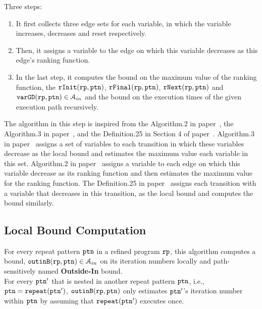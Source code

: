 \textbf{}

Three steps:
\begin{enumerate}
    \item It first collects three edge sets for each variable,
  in which the variable increases, decreases and reset respectively.
  \item
  Then, it assigns a variable to the edge on which this variable decreases as this edge's ranking function.
  \item
  In the last step, it computes the bound on the maximum value of the ranking function,
  the $\mathtt{rInit}(\mathtt{rp}, \mathtt{ptn})$,
  $\mathtt{rFinal}(\mathtt{rp}, \mathtt{ptn})$, $\mathtt{rNext}(\mathtt{rp}, \mathtt{ptn})$ and $\mathtt{varGD}(\mathtt{rp}, \mathtt{ptn}) \in \mathcal{A}_{in}$
   and the bound on the execution
  times of the given execution path recursively.
  \end{enumerate}

  The algorithm in this step is inspired from the Algorithm.2 in paper~\cite{SinnZV14},
  the Algorithm.3 in paper~\cite{ZulegerGSV11},
  and the Definition.25 in Section 4 of paper~\cite{sinn2017complexity}.
  Algorithm.3 in paper~\cite{ZulegerGSV11} assigns a set of variables to each transition in which these variables decrease as the local bound
  and estimates the maximum value each variable in this set.
  Algorithm.2 in paper~\cite{SinnZV14} assigns a variable to each edge on which this variable decrease as its ranking function
  and then estimates the maximum value for the ranking function.
  The Definition.25 in paper~\cite{sinn2017complexity}
  assigns each transition with a variable that decreases in this transition, as the local bound and computes the bound similarly.

\subsection{Local Bound Computation}
  For every repeat pattern $\mathtt{ptn}$ in a refined program $\mathtt{rp}$, 
this algorithm
computes a bound, $\mathtt{outinB}(\mathtt{rp}, \mathtt{ptn}) \in \mathcal{A}_{in}$ on its iteration numbers locally and path-sensitively
named \textbf{Outside-In} bound.
\\
For every $\mathtt{ptn}'$ that is nested
in another repeat pattern $\mathtt{ptn}$, i.e., $\mathtt{ptn} = \mathtt{repeat}(\mathtt{ptn}')$,
$\mathtt{outinB}(\mathtt{rp}, \mathtt{ptn})$ only estimates
$\mathtt{ptn}'$'s iteration number within $\mathtt{ptn}$ by assuming that $\mathtt{repeat}(\mathtt{ptn}')$ executes once.

